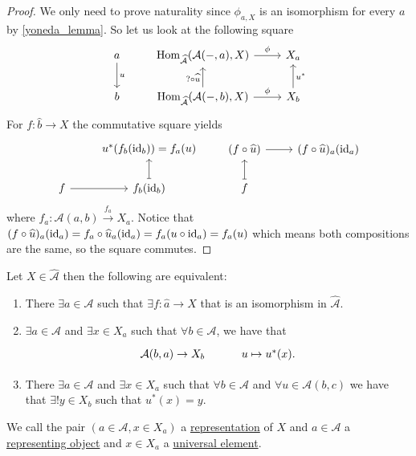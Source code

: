 \begin{proof}
    We only need to prove naturality since $\phi_{a,X}$ is an isomorphism for every $a$ by \cref{yoneda_lemma}.
    So let us look at the following square
    \[
    \begin{tikzcd}
        a 
        \arrow[d, "u"]       
        &
        \Hom_{\widehat{\mathcal{A}}}(\mathcal{A}(-,a),X) 
        \arrow[r , "\phi"]
        &
        X_a
        \\
        b 
        &
        \Hom_{\widehat{\mathcal{A}}}(\mathcal{A}(-,b),X) 
        \arrow[r, "\phi"]
        \arrow[u,"? \circ \widehat{u}"]
        &
        X_b
        \arrow[u, "u^*"']
    \end{tikzcd}
    \]
    For $f\colon \widehat{b} \to X$ the commutative square yields
    \[
    \begin{tikzcd}
        &
        u^*(f_b(\id_b))=f_a(u)
        \\
        f
        \arrow[r]
        &
        f_b(\id_b)
        \arrow[u, mapsto]
    \end{tikzcd}
    \qquad
    \begin{tikzcd}
        (f \circ \widehat{u})
        \arrow[r]
        &
        (f \circ \widehat{u})_a(\id_a)
        \\
        f
        \arrow[u, mapsto]
    \end{tikzcd}
    \]
    where $f_a \colon \mathcal{A}(a,b) \xrightarrow{f_a}X_a$.
    Notice that $ (f\circ\widehat{u})_a(\operatorname{id}_a) = f_a \circ \widehat{u}_a ( \operatorname{id}_a) = f_a ( u \circ \operatorname{id}_a) = f_a(u)$ which means both compositions 
    are the same, so the square commutes. 

\end{proof}

\begin{defi/prop}
    Let $X\in \widehat{\mathcal{A}}$ then the following are equivalent:
    \begin{enumerate}
        \item 
        There $\exists a \in \mathcal{A}$ such that $\exists f \colon \widehat{a} \to X $ that is an isomorphism in $\widehat{\mathcal{A}}$.
        \item 
        $\exists a \in \mathcal{A}$ and $\exists x \in X_a$ such that $\forall b \in \mathcal{A}$, we have that
        \[
        \begin{tikzcd}
            \mathcal{A}(b,a) \to X_b 
             &
             u \mapsto u^*(x).
        \end{tikzcd}
        \]
        \item 
        There $\exists a \in \mathcal{A}$ and $\exists x \in X_a$ such that $\forall b \in \mathcal{A}$ and $\forall u \in \mathcal{A}(b,c)$ we have that $\exists! y\in X_b$ such that $u^*(x)=y$.
    \end{enumerate}
    We call the pair $(a \in \mathcal{A}, x \in X_a)$ a \underline{representation} of $X$ and $a\in \mathcal{A}$ a \underline{representing object} and $x \in X_a$ a \underline{universal element}.
\end{defi/prop}

